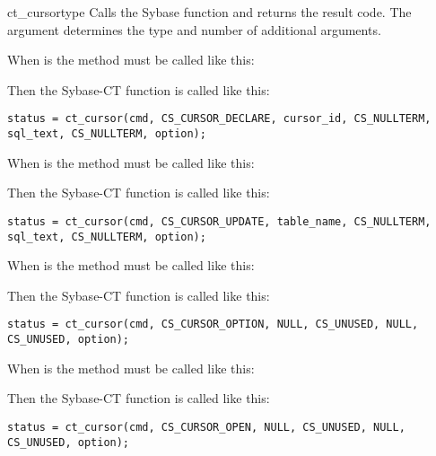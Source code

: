 \begin{methoddesc}[CS_COMMAND]{ct_cursor}{type \optional{, \ldots}}
Calls the Sybase  function and returns the
result code.  The  argument determines the type and number
of additional arguments.

When  is  the method must be called like
this:


Then the Sybase-CT  function is called like
this:

\begin{verbatim}
status = ct_cursor(cmd, CS_CURSOR_DECLARE, cursor_id, CS_NULLTERM, sql_text, CS_NULLTERM, option);
\end{verbatim}

When  is  the method must be called like
this:


Then the Sybase-CT  function is called like
this:

\begin{verbatim}
status = ct_cursor(cmd, CS_CURSOR_UPDATE, table_name, CS_NULLTERM, sql_text, CS_NULLTERM, option);
\end{verbatim}

When  is  the method must be called like
this:


Then the Sybase-CT  function is called like
this:

\begin{verbatim}
status = ct_cursor(cmd, CS_CURSOR_OPTION, NULL, CS_UNUSED, NULL, CS_UNUSED, option);
\end{verbatim}

When  is  the method must be called like
this:


Then the Sybase-CT  function is called like
this:

\begin{verbatim}
status = ct_cursor(cmd, CS_CURSOR_OPEN, NULL, CS_UNUSED, NULL, CS_UNUSED, option);
\end{verbatim}


\end{methoddesc}
